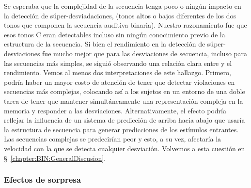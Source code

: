Se esperaba que la complejidad de la secuencia tenga poco o ningún impacto en la detección de súper-desviadaciones, (tonos altos o bajos diferentes de los dos tonos que componen la secuencia auditiva binaria). Nuestro razonamiento fue que esos tonos C eran detectables incluso sin ningún conocimiento previo de la estructura de la secuencia. Si bien el rendimiento en la detección de súper-desviaciones fue mucho mejor que para las desviaciones de secuencia, incluso para las secuencias más simples, se siguió observando una relación clara entre \mdlbin y el rendimiento. Vemos al menos dos interpretaciones de este hallazgo. Primero, podría haber un mayor costo de atención de tener que detectar violaciones en secuencias más complejas, colocando así a los sujetos en un entorno de una doble tarea de tener que mantener simultáneamente una representación compleja en la memoria y responder a las desviaciones. Alternativamente, el efecto podría reflejar la influencia de un sistema de predicción de arriba hacia abajo que usaría la estructura de secuencia para generar predicciones de los estímulos entrantes. Las secuencias complejas se predecirían peor y esto, a su vez, afectaría la velocidad con la que se detecta cualquier desviación. Volvemos a esta cuestión en \S~\ref{chapter:BIN:GeneralDiscusion}.

\subsubsection*{Efectos de sorpresa}

